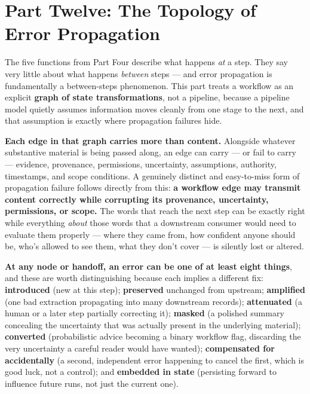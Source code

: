 \section{Part Twelve: The Topology of Error Propagation}

The five functions from Part Four describe what happens \emph{at} a step. They say very little about what happens \emph{between} steps --- and error propagation is fundamentally a between-steps phenomenon. This part treats a workflow as an explicit \textbf{graph of state transformations}, not a pipeline, because a pipeline model quietly assumes information moves cleanly from one stage to the next, and that assumption is exactly where propagation failures hide.

\textbf{Each edge in that graph carries more than content.} Alongside whatever substantive material is being passed along, an edge can carry --- or fail to carry --- evidence, provenance, permissions, uncertainty, assumptions, authority, timestamps, and scope conditions. A genuinely distinct and easy-to-miss form of propagation failure follows directly from this: \textbf{a workflow edge may transmit content correctly while corrupting its provenance, uncertainty, permissions, or scope.} The words that reach the next step can be exactly right while everything \emph{about} those words that a downstream consumer would need to evaluate them properly --- where they came from, how confident anyone should be, who's allowed to see them, what they don't cover --- is silently lost or altered.

\textbf{At any node or handoff, an error can be one of at least eight things}, and these are worth distinguishing because each implies a different fix: \textbf{introduced} (new at this step); \textbf{preserved} unchanged from upstream; \textbf{amplified} (one bad extraction propagating into many downstream records); \textbf{attenuated} (a human or a later step partially correcting it); \textbf{masked} (a polished summary concealing the uncertainty that was actually present in the underlying material); \textbf{converted} (probabilistic advice becoming a binary workflow flag, discarding the very uncertainty a careful reader would have wanted); \textbf{compensated for accidentally} (a second, independent error happening to cancel the first, which is good luck, not a control); and \textbf{embedded in state} (persisting forward to influence future runs, not just the current one).

